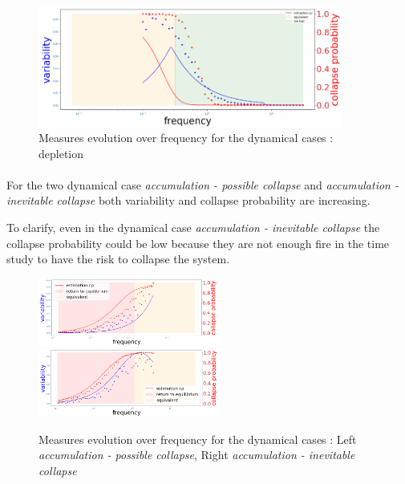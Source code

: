 \documentclass{article}
\begin{document}
\begin{figure}[h!]
\begin{center}
\includegraphics[width=10cm]{results/fuel_low.png}
\end{center}
\caption{\label{fig:temp}Measures evolution over frequency for the dynamical cases : depletion}
\end{figure}


\paragraph{}
For the two dynamical case \textit{accumulation - possible collapse} and \textit{accumulation - inevitable collapse} both variability and collapse probability are increasing.

To clarify, even in the dynamical case \textit{accumulation - inevitable collapse} the collapse probability could be low because they are not enough fire in the time study to have the risk to collapse the system.

\begin{figure}[h!]
\begin{center}
\includegraphics[width=6cm]{results/return_moderate_2.png}
\includegraphics[width=6cm]{results/return_always_2.png} 
\end{center}
\caption{\label{fig:temp}Measures evolution over frequency for the dynamical cases : Left \textit{accumulation - possible collapse}, Right \textit{accumulation - inevitable collapse}}
\end{figure}
\end{document}
